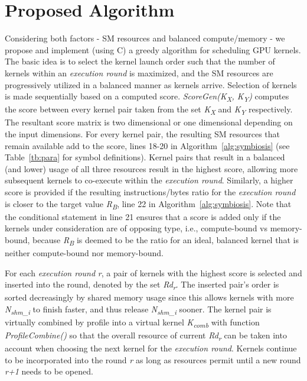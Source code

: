 \documentclass[twocolumn]{el-author}
\begin{document}
\section{Proposed Algorithm}
Considering both factors - SM resources and balanced compute/memory - we propose and implement (using C) a greedy algorithm for scheduling GPU kernels. The basic idea is to select the kernel launch order such that the number of kernels within an \emph{execution round} is maximized, and the SM resources are progressively utilized in a balanced manner
as kernels arrive.
Selection of kernels is made sequentially based on a computed score. \emph{ScoreGen(K\textsubscript{X}, K\textsubscript{Y})} computes the score between every kernel pair 
taken from the set \emph{K\textsubscript{X}} and \emph{K\textsubscript{Y}} respectively.  The resultant score matrix is two dimensional or one dimensional
depending on the input dimensions.  For every kernel pair, the resulting SM resources that remain available add to the score, lines 18-20 in Algorithm~\ref{alg:symbiosis} (see Table~\ref{tb:para} 
for symbol definitions).  Kernel pairs that result in a balanced (and lower) usage of all three resources result in the highest score, allowing more 
subsequent kernels to co-execute within the \emph{execution round}.  Similarly, a higher score is provided if the resulting instructions/bytes ratio for the 
\emph{execution round} is closer to the target value \emph{R\textsubscript{B}}, line 22 in Algorithm~\ref{alg:symbiosis}.  Note that the conditional statement in line 21 ensures that a score is added only if the kernels under consideration are of opposing type, i.e., compute-bound vs memory-bound, because \emph{R\textsubscript{B}} is deemed to be the ratio
for an ideal, balanced kernel that is neither compute-bound nor memory-bound.   

For each \emph{execution round} \emph{{r}}, a pair of kernels with the highest score is selected and inserted into the round, denoted
by the set \emph{Rd\textsubscript{r}}. The inserted pair's order is sorted decreasingly by shared memory usage since this allows kernels with more \emph{N\textsubscript{shm\_i}} to finish faster, and thus release \emph{N\textsubscript{shm\_i}} sooner. The kernel pair is virtually combined by profile into a virtual kernel \emph{K\textsubscript{comb}} with function \emph{ProfileCombine()} so that the overall resource of current \emph{Rd\textsubscript{r}} can be taken into account when choosing the next kernel for the \emph{execution round}. Kernels continue to 
be incorporated into the round \emph{{r}} as long as resources permit until a new round \emph{{r+1}} needs to be opened.
\end{document}
